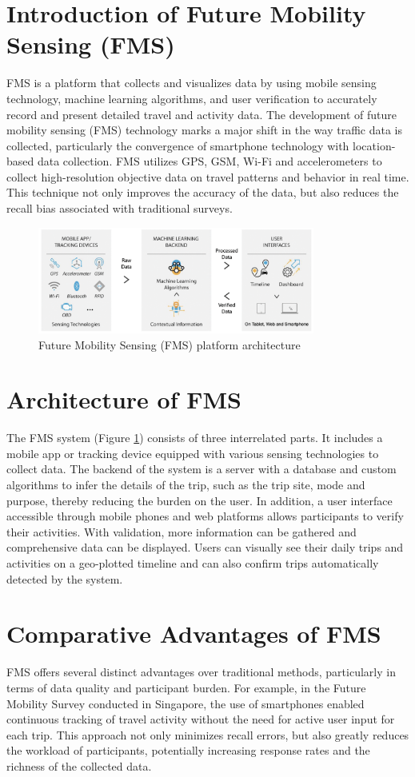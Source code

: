 \documentclass[12pt,two side]{report}
\begin{document}
\section{Introduction of Future Mobility Sensing (FMS)\cite{alho2022online}\cite{cottrill2013future}}
FMS is a platform that collects and visualizes data by using mobile sensing technology, machine learning algorithms, and user verification to accurately record and present detailed travel and activity data. The development of future mobility sensing (FMS) technology marks a major shift in the way traffic data is collected, particularly the convergence of smartphone technology with location-based data collection. FMS utilizes GPS, GSM, Wi-Fi and accelerometers to collect high-resolution objective data on travel patterns and behavior in real time. This technique not only improves the accuracy of the data, but also reduces the recall bias associated with traditional surveys.
\begin{figure}
\centering
\includegraphics[width=9.1cm]{background_report/figures/FMS.png}
\caption{Future Mobility Sensing (FMS) platform architecture\cite{cottrill2013future}}
\label{figure:1}
\end{figure}
\section{Architecture of FMS\cite{cottrill2013future}}
The FMS system (Figure \ref{figure:1}) consists of three interrelated parts. It includes a mobile app or tracking device equipped with various sensing technologies to collect data. The backend of the system is a server with a database and custom algorithms to infer the details of the trip, such as the trip site, mode and purpose, thereby reducing the burden on the user. In addition, a user interface accessible through mobile phones and web platforms allows participants to verify their activities. With validation, more information can be gathered and comprehensive data can be displayed. Users can visually see their daily trips and activities on a geo-plotted timeline and can also confirm trips automatically detected by the system.
\section{Comparative Advantages of FMS}
FMS offers several distinct advantages over traditional methods, particularly in terms of data quality and participant burden. For example, in the Future Mobility Survey conducted in Singapore, the use of smartphones enabled continuous tracking of travel activity without the need for active user input for each trip. This approach not only minimizes recall errors, but also greatly reduces the workload of participants, potentially increasing response rates and the richness of the collected data.\newline
\end{document}
